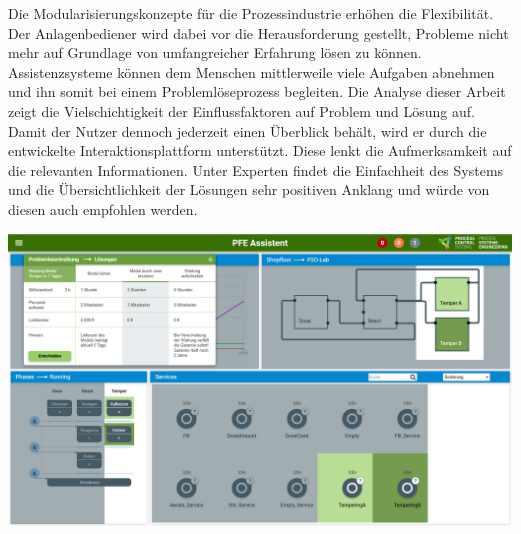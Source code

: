 
Die Modularisierungskonzepte für die Prozessindustrie erhöhen die Flexibilität. Der Anlagenbediener wird dabei vor die Herausforderung gestellt, Probleme nicht mehr auf Grundlage von umfangreicher Erfahrung lösen zu können. Assistenzsysteme können dem Menschen mittlerweile viele Aufgaben abnehmen und ihn somit bei einem Problemlöseprozess begleiten. Die Analyse dieser Arbeit zeigt die Vielschichtigkeit der Einflussfaktoren auf Problem und Lösung auf. Damit der Nutzer dennoch jederzeit einen Überblick behält, wird er durch die entwickelte Interaktionsplattform unterstützt. Diese lenkt die Aufmerksamkeit auf die relevanten Informationen. Unter Experten findet die Einfachheit des Systems und die Übersichtlichkeit der Lösungen sehr positiven Anklang und würde von diesen auch empfohlen werden.

\vspace{10pt}
\begin{center}
\includegraphics[scale=0.25]{DA_files/Bilder/Konzept/Skizze-Loesungen-PFE.png}
\end{center}
\vspace{6pt}